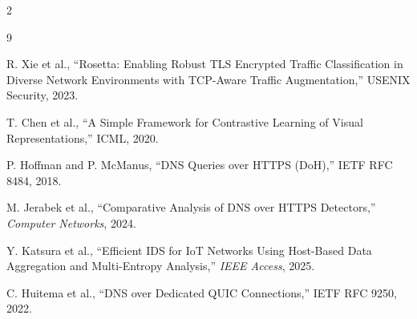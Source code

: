\documentclass[a4paper,11pt]{article}
\begin{document}
\begin{multicols}{2}
\renewcommand{\refname}{\normalsize References}
\begin{thebibliography}{9}
\setlength{\itemsep}{0pt}
\setlength{\parsep}{0pt}
\footnotesize

R. Xie et al., ``Rosetta: Enabling Robust TLS Encrypted Traffic
Classification in Diverse Network Environments with TCP-Aware Traffic
Augmentation,'' USENIX Security, 2023.

T. Chen et al., ``A Simple Framework for Contrastive Learning of Visual
Representations,'' ICML, 2020.

P. Hoffman and P. McManus, ``DNS Queries over HTTPS (DoH),'' IETF RFC
8484, 2018.

M. Jerabek et al., ``Comparative Analysis of DNS over HTTPS Detectors,''
\emph{Computer Networks}, 2024.

Y. Katsura et al., ``Efficient IDS for IoT Networks Using Host-Based Data
Aggregation and Multi-Entropy Analysis,'' \emph{IEEE Access}, 2025.

C. Huitema et al., ``DNS over Dedicated QUIC Connections,'' IETF RFC 9250,
2022.

\end{thebibliography}

\end{multicols}
\end{document}
